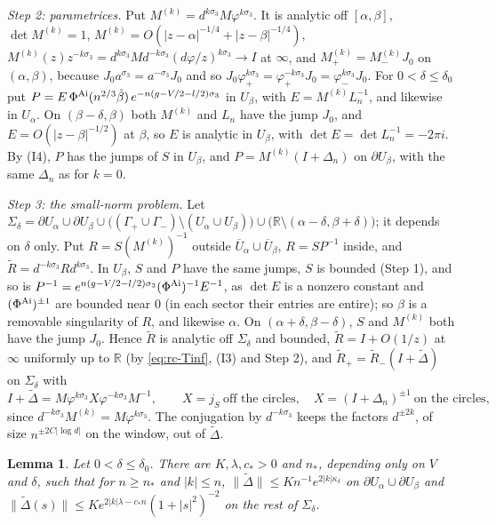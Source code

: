 \documentclass[11pt]{amsart}
\newtheorem{lemma}[theorem]{Lemma}
\theoremstyle{definition}
\theoremstyle{remark}
\numberwithin{equation}{section}
\newcommand{\R}{\mathbb{R}}
\begin{document}
\emph{Step 2: parametrices.} Put $M^{(k)}=d^{k\sigma_3}M\varphi^{k\sigma_3}$. It is analytic off $[\alpha,\beta]$, $\det M^{(k)}=1$, $M^{(k)}=O(|z-\alpha|^{-1/4}+|z-\beta|^{-1/4})$, $M^{(k)}(z)z^{-k\sigma_3}=d^{k\sigma_3}Md^{-k\sigma_3}(d\varphi/z)^{k\sigma_3}\to I$ at $\infty$, and $M^{(k)}_+=M^{(k)}_-J_0$ on $(\alpha,\beta)$, because $J_0a^{\sigma_3}=a^{-\sigma_3}J_0$ and so $J_0\varphi_+^{k\sigma_3}=\varphi_+^{-k\sigma_3}J_0=\varphi_-^{k\sigma_3}J_0$. For $0<\delta\le\delta_0$ put $P=E\,\Phi^{\rm Ai}(n^{2/3}\hat\beta)\,e^{-n(g-V/2-l/2)\sigma_3}$ in $U_\beta$, with $E=M^{(k)}L_n^{-1}$, and likewise in $U_\alpha$. On $(\beta-\delta,\beta)$ both $M^{(k)}$ and $L_n$ have the jump $J_0$, and $E=O(|z-\beta|^{-1/2})$ at $\beta$, so $E$ is analytic in $U_\beta$, with $\det E=\det L_n^{-1}=-2\pi i$. By (I4), $P$ has the jumps of $S$ in $U_\beta$, and $P=M^{(k)}(I+\Delta_n)$ on $\partial U_\beta$, with the same $\Delta_n$ as for $k=0$.

\emph{Step 3: the small-norm problem.} Let $\Sigma_\delta=\partial U_\alpha\cup\partial U_\beta\cup\bigl((\Gamma_+\cup\Gamma_-)\setminus(U_\alpha\cup U_\beta)\bigr)\cup\bigl(\R\setminus(\alpha-\delta,\beta+\delta)\bigr)$; it depends on $\delta$ only. Put $R=S(M^{(k)})^{-1}$ outside $\overline U_\alpha\cup\overline U_\beta$, $R=SP^{-1}$ inside, and $\widetilde R=d^{-k\sigma_3}Rd^{k\sigma_3}$. In $U_\beta$, $S$ and $P$ have the same jumps, $S$ is bounded (Step 1), and so is $P^{-1}=e^{n(g-V/2-l/2)\sigma_3}(\Phi^{\rm Ai})^{-1}E^{-1}$, as $\det E$ is a nonzero constant and $(\Phi^{\rm Ai})^{\pm1}$ are bounded near $0$ (in each sector their entries are entire); so $\beta$ is a removable singularity of $R$, and likewise $\alpha$. On $(\alpha+\delta,\beta-\delta)$, $S$ and $M^{(k)}$ both have the jump $J_0$. Hence $\widetilde R$ is analytic off $\Sigma_\delta$ and bounded, $\widetilde R=I+O(1/z)$ at $\infty$ uniformly up to $\R$ (by \eqref{eq:rc-Tinf}, (I3) and Step 2), and $\widetilde R_+=\widetilde R_-(I+\widetilde\Delta)$ on $\Sigma_\delta$ with
\[
I+\widetilde\Delta=M\varphi^{k\sigma_3}X\varphi^{-k\sigma_3}M^{-1},\qquad X=j_S\ \text{off the circles},\quad X=(I+\Delta_n)^{\pm1}\ \text{on the circles},
\]
since $d^{-k\sigma_3}M^{(k)}=M\varphi^{k\sigma_3}$. The conjugation by $d^{-k\sigma_3}$ keeps the factors $d^{\pm2k}$, of size $n^{\pm2C|\log d|}$ on the window, out of $\widetilde\Delta$.

\begin{lemma}\label{lem:rc-jumps}
Let $0<\delta\le\delta_0$. There are $K,\lambda,c_*>0$ and $n_*$, depending only on $V$ and $\delta$, such that for $n\ge n_*$ and $|k|\le n$, $\|\widetilde\Delta\|\le Kn^{-1}e^{2|k|\kappa_\delta}$ on $\partial U_\alpha\cup\partial U_\beta$ and $\|\widetilde\Delta(s)\|\le Ke^{2|k|\lambda-c_*n}(1+|s|^2)^{-2}$ on the rest of $\Sigma_\delta$.
\end{lemma}
\end{document}
